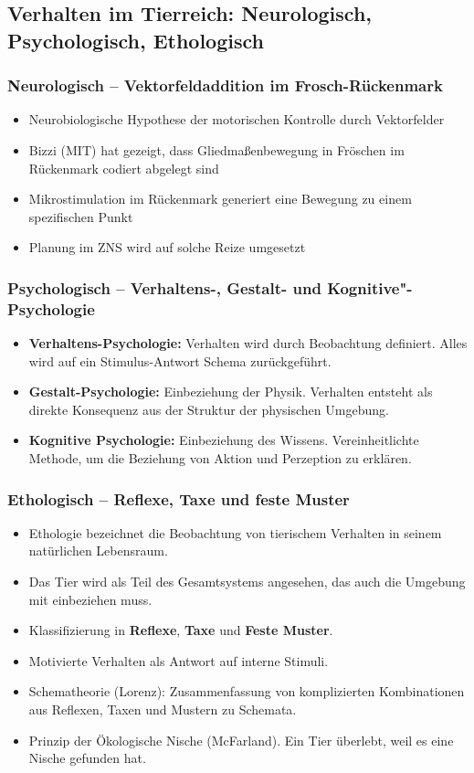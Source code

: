 \subsection{Verhalten im Tierreich: Neurologisch, Psychologisch, Ethologisch}

\subsubsection{Neurologisch -- Vektorfeldaddition im Frosch-Rückenmark}
\begin{itemize}
	\item Neurobiologische Hypothese der motorischen Kontrolle durch Vektorfelder
	\item Bizzi (MIT) hat gezeigt, dass Gliedmaßenbewegung in Fröschen im Rückenmark codiert abgelegt sind
	\item Mikrostimulation im Rückenmark generiert eine Bewegung zu einem spezifischen Punkt
	\item Planung im ZNS wird auf solche Reize umgesetzt
\end{itemize}

\subsubsection{Psychologisch -- Verhaltens-, Gestalt- und Kognitive"-Psychologie}
\begin{itemize}
	\item \textbf{Verhaltens-Psychologie:}
	Verhalten wird durch Beobachtung definiert.
	Alles wird auf ein Stimulus-Antwort Schema zurückgeführt.
	\item \textbf{Gestalt-Psychologie:}
	Einbeziehung der Physik.
	Verhalten entsteht als direkte Konsequenz aus der Struktur der physischen Umgebung.
	\item \textbf{Kognitive Psychologie:}
	Einbeziehung des Wissens.
	Vereinheitlichte Methode, um die Beziehung von Aktion und Perzeption zu erklären.
\end{itemize}

\subsubsection{Ethologisch -- Reflexe, Taxe und feste Muster}
\begin{itemize}
	\item Ethologie bezeichnet die Beobachtung von tierischem Verhalten in seinem natürlichen Lebensraum.
	\item Das Tier wird als Teil des Gesamtsystems angesehen, das auch die Umgebung mit einbeziehen muss.
	\item Klassifizierung in \textbf{Reflexe}, \textbf{Taxe} und \textbf{Feste  Muster}.
	\item Motivierte Verhalten als Antwort auf interne Stimuli.
	\item Schematheorie (Lorenz): Zusammenfassung von komplizierten Kombinationen aus Reflexen, Taxen und Mustern zu Schemata.
	\item Prinzip der \glqq Ökologische Nische \grqq (McFarland). Ein Tier überlebt, weil es eine Nische gefunden hat.
\end{itemize}

